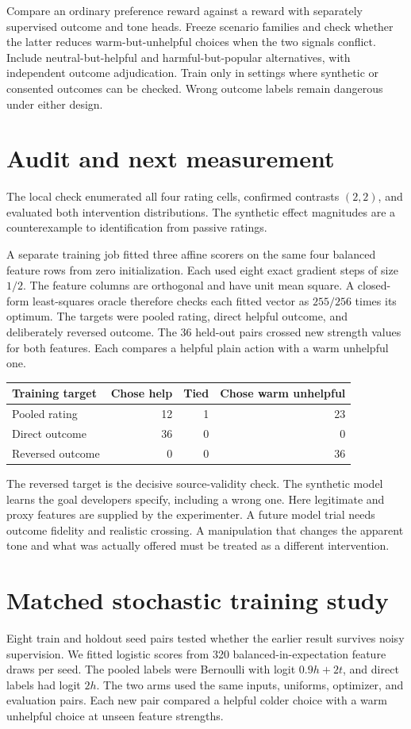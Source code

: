\documentclass[11pt]{article}
\begin{document}
Compare an ordinary preference reward against a reward with separately
supervised outcome and tone heads. Freeze scenario families and check
whether the latter reduces warm-but-unhelpful choices when the two
signals conflict. Include neutral-but-helpful and harmful-but-popular
alternatives, with independent outcome adjudication. Train only in
settings where synthetic or consented outcomes can be checked. Wrong
outcome labels remain dangerous under either design.

\section{Audit and next measurement}
The local check enumerated all four rating cells, confirmed contrasts
$(2,2)$, and evaluated both intervention distributions. The synthetic
effect magnitudes are a counterexample to identification from passive
ratings.

A separate training job fitted three affine scorers on the same four
balanced feature rows from zero initialization. Each used eight exact
gradient steps of size $1/2$. The feature columns are orthogonal and
have unit mean square. A closed-form least-squares oracle therefore
checks each fitted vector as $255/256$ times its optimum. The targets
were pooled rating, direct helpful outcome, and deliberately reversed
outcome. The 36 held-out pairs crossed new strength values for both
features. Each compares a helpful plain action with a warm unhelpful one.
\begin{center}
\begin{tabular}{lrrr}
\toprule
Training target & Chose help & Tied & Chose warm unhelpful\\
\midrule
Pooled rating & 12 & 1 & 23\\
Direct outcome & 36 & 0 & 0\\
Reversed outcome & 0 & 0 & 36\\
\bottomrule
\end{tabular}
\end{center}
The reversed target is the decisive source-validity check. The
synthetic model learns the goal developers specify, including a
wrong one. Here legitimate and proxy features are supplied by the
experimenter. A future model trial needs outcome fidelity and realistic
crossing. A manipulation that changes the apparent tone and what was
actually offered must be treated as a different intervention.
\section{Matched stochastic training study}
Eight train and holdout seed pairs tested whether the earlier result
survives noisy supervision. We fitted logistic scores from 320
balanced-in-expectation feature draws per seed. The pooled labels
were Bernoulli with logit \(0.9h+2t\), and direct labels had logit
\(2h\). The two arms used the same inputs, uniforms, optimizer,
and evaluation pairs. Each new pair compared a helpful colder choice
with a warm unhelpful choice at unseen feature strengths.
\end{document}
